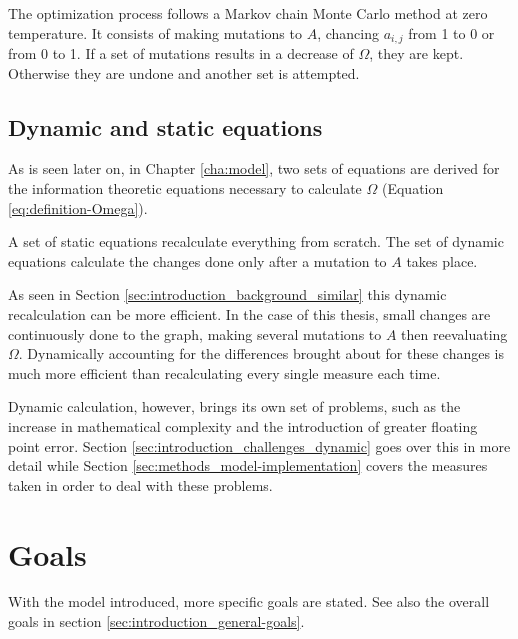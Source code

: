 The optimization process follows a Markov chain Monte Carlo method at zero temperature.
It consists of making mutations to $A$, chancing $a_{i,j}$ from 1 to 0 or from 0 to 1.
If a set of mutations results in a decrease of $\Omega$, they are kept.
Otherwise they are undone and another set is attempted.

\subsection{Dynamic and static equations}
\label{sec:introduction_model_dynamic-static}

As is seen later on, in Chapter \ref{cha:model}, two sets of equations are derived for the information theoretic equations necessary to calculate $\Omega$ (Equation \ref{eq:definition-Omega}).

A set of static equations recalculate everything from scratch.
The set of dynamic equations calculate the changes done only after a mutation to $A$ takes place.

As seen in Section \ref{sec:introduction_background_similar} this dynamic recalculation can be more efficient.
In the case of this thesis, small changes are continuously done to the graph, making several mutations to $A$ then reevaluating $\Omega$.
Dynamically accounting for the differences brought about for these changes is much more efficient than recalculating every single measure each time.

Dynamic calculation, however, brings its own set of problems, such as the increase in mathematical complexity and the introduction of greater floating point error.
Section \ref{sec:introduction_challenges_dynamic} goes over this in more detail while Section \ref{sec:methods_model-implementation} covers the measures taken in order to deal with these problems.

\section{Goals}
\label{sec:introduction_goals}

With the model introduced, more specific goals are stated. See also the overall goals in section \ref{sec:introduction_general-goals}.

